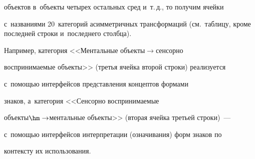 объектов в~объекты четырех остальных сред и~т.\,д., то \mbox{получим} ячейки 

с~названиями 20~категорий асимметричных трансформаций (см.\ таб\-ли\-цу, кроме последней строки и~последнего столбца). 

Например, категория <<Ментальные объ\-ек\-ты\;$\to$\;сен\-сор\-но 

воспринимаемые объекты>> (третья ячейка второй строки) реализуется 

с~по\-мощью интерфейсов пред\-став\-ле\-ния \mbox{концептов} формами 

знаков, а~категория <<Сенсорно воспринимаемые  

объ\-ек\-ты\;$\hm\to$\;менталь\-ные объекты>> (вторая ячейка третьей строки)~--- 

с~по\-мощью интерфей\-сов интерпретации (означивания) форм знаков по 

контексту их использования.

      {%

      

      }

  

      

